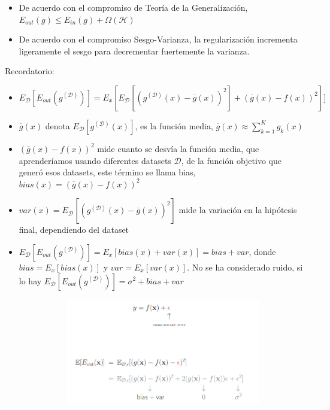 \documentclass[11pt,a4paper]{article}
\theoremstyle{definition}
\begin{document}
	\begin{itemize}
		\item De acuerdo con el compromiso de Teoría de la Generalización, $E_{out}(g)\leq E_{in}(g)+\Omega(\mathcal{H})$
		\item De acuerdo con el compromiso Sesgo-Varianza, la regularización incrementa ligeramente el sesgo para decrementar fuertemente la varianza.
	\end{itemize}
	Recordatorio: 
	\begin{itemize}
		\item $E_{\mathcal{D}}[E_{out}(g^{(\mathcal{D})})]=E_x[E_\mathcal{D}[(g^{(\mathcal{D})}(x)-\overline{g}(x))^2]+(\overline{g}(x)-f(x))^2]]$
		\item $\overline{g}(x)$ denota $E_\mathcal{D}[g^{(\mathcal{D})}(x)]$, es la función media, $\overline{g}(x)\approx \sum_{k=1}^K g_k(x)$
		\item $(\overline{g}(x) -f(x))^2$ mide cuanto se desvía la función media, que aprenderíamos usando diferentes datasets $\mathcal{D}$, de la función objetivo que generó esos datasets, este término se llama bias, $bias(x)=(\overline{g}(x)-f(x))^2$
		\item $var(x)=E_{\mathcal{D}}[(g^{(\mathcal{D})}(x)-\overline{g}(x))^2]$ mide la variación en la hipótesis final, dependiendo del dataset
		\item $E_\mathcal{D}[E_{out}(g^{(\mathcal{D})})]=E_x[bias(x)+var(x)]=bias+var$, donde $bias=E_x[bias(x)]$ y $var=E_x[var(x)]$. No se ha considerado ruido, si lo hay $E_{\mathcal{D}}[E_{out}(g^{(\mathcal{D})})]=\sigma ^2 + bias + var $
	\begin{figure}[H]
		\centering
		\begin{subfigure}{.5\textwidth}
  		\centering
  		\includegraphics[width=1\textwidth]{images/noise_bv_des1}
  		\caption{}
  		\label{fig:sub1}
		\end{subfigure}%

\end{figure}
\end{itemize}
\end{document}
